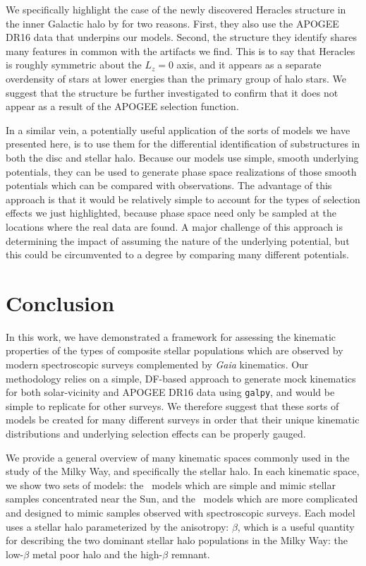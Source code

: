 We specifically highlight the case of the newly discovered Heracles structure in the inner Galactic halo by \textcite{horta21a} for two reasons. First, they also use the APOGEE DR16 data that underpins our models. Second, the structure they identify shares many features in common with the artifacts we find. This is to say that Heracles is roughly symmetric about the $L_{z}=0$ axis, and it appears as a separate overdensity of stars at lower energies than the primary group of halo stars. We suggest that the structure be further investigated to confirm that it does not appear as a result of the APOGEE selection function.

In a similar vein, a potentially useful application of the sorts of models we have presented here, is to use them for the differential identification of substructures in both the disc and stellar halo. Because our models use simple, smooth underlying potentials, they can be used to generate phase space realizations of those smooth potentials which can be compared with observations. The advantage of this approach is that it would be relatively simple to account for the types of selection effects we just highlighted, because phase space need only be sampled at the locations where the real data are found. A major challenge of this approach is determining the impact of assuming the nature of the underlying potential, but this could be circumvented to a degree by comparing many different potentials.

\section{Conclusion}

In this work, we have demonstrated a framework for assessing the kinematic properties of the types of composite stellar populations which are observed by modern spectroscopic surveys complemented by \textit{Gaia} kinematics. Our methodology relies on a simple, DF-based approach to generate mock kinematics for both solar-vicinity and APOGEE DR16 data using \texttt{galpy}, and would be simple to replicate for other surveys. We therefore suggest that these sorts of models be created for many different surveys in order that their unique kinematic distributions and underlying selection effects can be properly gauged.

We provide a general overview of many kinematic spaces commonly used in the study of the Milky Way, and specifically the stellar halo. In each kinematic space, we show two sets of models: the \solar\ models which are simple and mimic stellar samples concentrated near the Sun, and the \survey\ models which are more complicated and designed to mimic samples observed with spectroscopic surveys. Each model uses a stellar halo parameterized by the anisotropy: $\beta$, which is a useful quantity for describing the two dominant stellar halo populations in the Milky Way: the low-$\beta$ metal poor halo and the high-$\beta$ \gse remnant.


